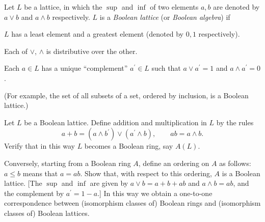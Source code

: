 \begin{exercise}
\label{ex:1.24}
Let $L$ be a lattice, in which the $\sup$ and $\inf$ of two elements $a,b$ are denoted by $a \vee b$ and $a \wedge b$ respectively.
$L$ is a \emph{Boolean lattice} (or \emph{Boolean algebra}) if
\begin{rlist}
\item
\label{ex:1.24.i}
$L$ has a least element and a greatest element (denoted by $0,1$ respectively).
\item
\label{ex:1.24.ii}
Each of $\vee$, $\wedge$ is distributive over the other.
\item
\label{ex:1.24.iii}
Each $a \in L$ has a unique ``complement'' $a^\prime \in L$ such that $a \vee a^\prime = 1$ and $a \wedge a^\prime = 0$.
\end{rlist}
(For example, the set of all subsets of a set, ordered by inclusion, is a Boolean lattice.)

Let $L$ be a Boolean lattice.
Define addition and multiplication in $L$ by the rules
\begin{equation*}
a + b
= (a \wedge b^\prime) \vee (a^\prime \wedge b),
\qquad
a b
= a \wedge b.
\end{equation*}
Verify that in this way $L$ becomes a Boolean ring, say $A(L)$.

Conversely, starting from a Boolean ring $A$, define an ordering on $A$ as follows:
$a \leq b$ means that $a = a b$.
Show that, with respect to this ordering, $A$ is a Boolean lattice.
[The $\sup$ and $\inf$ are given by $a \vee b = a + b + a b$ and $a \wedge b = ab$, and the complement by $a^\prime = 1 - a$.]
In this way we obtain a one-to-one correspondence between (isomorphism classes of) Boolean rings and (isomorphism classes of) Boolean lattices.
\end{exercise}

